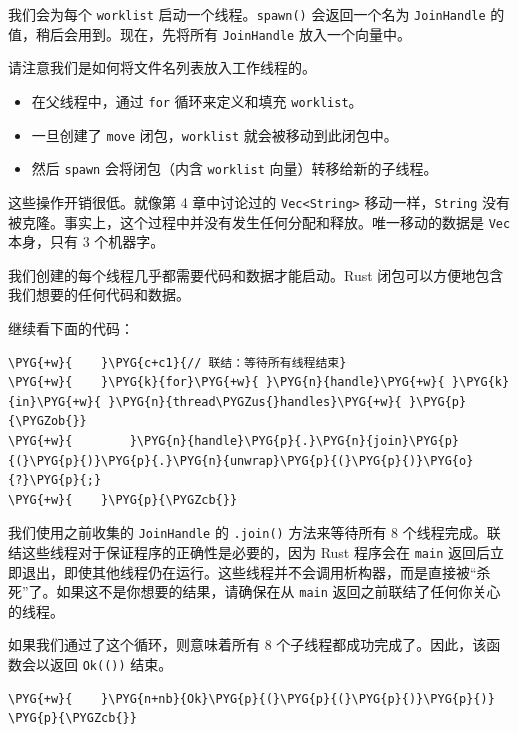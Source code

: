 我们会为每个 \texttt{worklist} 启动一个线程。\texttt{spawn()} 会返回一个名为 \texttt{JoinHandle} 的值，稍后会用到。现在，先将所有 \texttt{JoinHandle} 放入一个向量中。

请注意我们是如何将文件名列表放入工作线程的。

\begin{itemize}
\item 在父线程中，通过 \texttt{for} 循环来定义和填充 \texttt{worklist}。
\item 一旦创建了 \texttt{move} 闭包，\texttt{worklist} 就会被移动到此闭包中。
\item 然后 \texttt{spawn} 会将闭包（内含 \texttt{worklist} 向量）转移给新的子线程。
\end{itemize}

这些操作开销很低。就像第 4 章中讨论过的 \texttt{Vec<String>} 移动一样，\texttt{String} 没有被克隆。事实上，这个过程中并没有发生任何分配和释放。唯一移动的数据是 \texttt{Vec} 本身，只有 3 个机器字。

我们创建的每个线程几乎都需要代码和数据才能启动。Rust 闭包可以方便地包含我们想要的任何代码和数据。

继续看下面的代码：

\begin{Verbatim}[commandchars=\\\{\},breaklines=true,breakanywhere=true,fontsize=\codefont,xleftmargin=17bp]
\PYG{+w}{    }\PYG{c+c1}{// 联结：等待所有线程结束}
\PYG{+w}{    }\PYG{k}{for}\PYG{+w}{ }\PYG{n}{handle}\PYG{+w}{ }\PYG{k}{in}\PYG{+w}{ }\PYG{n}{thread\PYGZus{}handles}\PYG{+w}{ }\PYG{p}{\PYGZob{}}
\PYG{+w}{        }\PYG{n}{handle}\PYG{p}{.}\PYG{n}{join}\PYG{p}{(}\PYG{p}{)}\PYG{p}{.}\PYG{n}{unwrap}\PYG{p}{(}\PYG{p}{)}\PYG{o}{?}\PYG{p}{;}
\PYG{+w}{    }\PYG{p}{\PYGZcb{}}
\end{Verbatim}

我们使用之前收集的 \texttt{JoinHandle} 的 \texttt{.join()} 方法来等待所有 8 个线程完成。联结这些线程对于保证程序的正确性是必要的，因为 Rust 程序会在 \texttt{main} 返回后立即退出，即使其他线程仍在运行。这些线程并不会调用析构器，而是直接被“杀死”了。如果这不是你想要的结果，请确保在从 \texttt{main} 返回之前联结了任何你关心的线程。

如果我们通过了这个循环，则意味着所有 8 个子线程都成功完成了。因此，该函数会以返回 \texttt{Ok(())} 结束。

\begin{Verbatim}[commandchars=\\\{\},breaklines=true,breakanywhere=true,fontsize=\codefont,xleftmargin=17bp]
\PYG{+w}{    }\PYG{n+nb}{Ok}\PYG{p}{(}\PYG{p}{(}\PYG{p}{)}\PYG{p}{)}
\PYG{p}{\PYGZcb{}}
\end{Verbatim}

